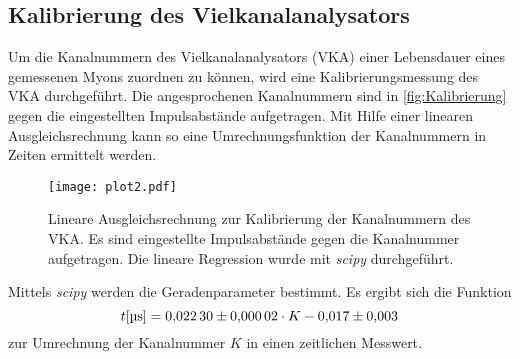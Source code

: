 \subsection{Kalibrierung des Vielkanalanalysators}
Um die Kanalnummern des Vielkanalanalysators (VKA) einer Lebensdauer eines gemessenen Myons zuordnen zu können, wird eine Kalibrierungsmessung des VKA durchgeführt.
Die angesprochenen Kanalnummern sind in \autoref{fig:Kalibrierung} gegen die eingestellten Impulsabstände aufgetragen. Mit Hilfe einer linearen Ausgleichsrechnung
kann so eine Umrechnungsfunktion der Kanalnummern in Zeiten ermittelt werden. 
\begin{figure}
  \centering
  \texttt{[image: plot2.pdf]}
  \caption{Lineare Ausgleichsrechnung zur Kalibrierung der Kanalnummern des VKA. 
  Es sind eingestellte Impulsabstände gegen die Kanalnummer aufgetragen. Die lineare Regression wurde mit \textit{scipy} \cite{scipy} durchgeführt.}
  \label{fig:Kalibrierung}
\end{figure}
Mittels \textit{scipy} \cite{scipy} werden die Geradenparameter bestimmt. Es ergibt sich die Funktion
\begin{equation*}
  t [\unit{\micro\second}] = \num{0.0223 +- 0.00002} \cdot K - \num{0.017 \pm 0.003}
\end{equation*}
zur Umrechnung der Kanalnummer $K$ in einen zeitlichen Messwert.


